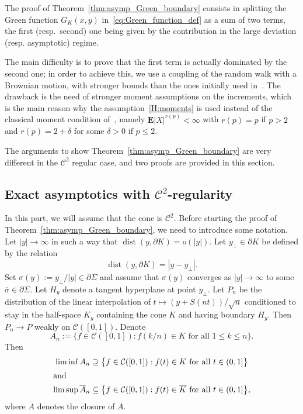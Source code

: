 \documentclass[10pt]{amsart}
\theoremstyle{definition}\newtheorem{defi}[theo]{Definition}\newtheorem{rema}[theo]{Remark}\newtheorem{exam}[theo]{Example}\newtheorem{exem}[theo]{Example}\newtheorem{nota}[theo]{Notation}
\DeclareMathOperator{\dist}{dist}
\newcommand{\clC}{\mathcal{C}}
\newcommand{\e}{\mathbf{E}}
\renewcommand{\le}{\leqslant}
\renewcommand{\leq}{\leqslant}
\begin{document}
The proof of Theorem~\ref{thm:asymp_Green_boundary} consists in splitting the Green function $G_K(x,y)$ in~\eqref{eq:Green_function_def} as a sum of two terms, the first (resp.\ second) one being given by the contribution in the large deviation (resp. asymptotic) regime.

The main difficulty is to prove that the first term is actually dominated by the second one; in order to achieve this, we use a coupling of the random walk with a Brownian motion, with stronger bounds than the ones initially used in~\cite{DeWa-15}. The drawback is the need of stronger moment assumptions on the increments, which is the main reason why the assumption~\eqref{H:moments} is used instead of the classical moment condition of~\cite{DeWa-15}, namely $\e| X|^{r(p)}<\infty$ with $r(p)=p$ if $p>2$ and $r(p)=2+\delta$ for some $\delta>0$ if $p\leq 2$.

The arguments to show Theorem~\ref{thm:asymp_Green_boundary} are very different in the $\clC^2$ regular case, and two proofs are provided in this section.

\subsection*{Exact asymptotics with \texorpdfstring{$\clC^{2}$}{C2}-regularity} In this part, we will assume that the cone is $\clC^{2}$. Before starting the proof of Theorem~\ref{thm:asymp_Green_boundary}, we need to introduce some notation. Let $| y|\to\infty$ in such a way that $\dist(y,\partial K)=o(| y|)$. Let $y_\perp\in\partial K$ be defined by the relation
\[
\dist(y,\partial K)=|y-y_\perp|.
\]
Set $\sigma(y):=y_\perp/| y|\in\partial\Sigma$ and assume that $\sigma(y)$ converges as $| y|\to\infty$ to some $\overline{\sigma}\in \partial\Sigma$. Let $H_y$ denote a tangent hyperplane at point $y_\perp.$ Let $P_n$ be the distribution of the linear interpolation of $t\mapsto (y+S(nt))/\sqrt{n}$ conditioned to stay in the half-space $K_y$ containing the cone $K$ and having boundary $H_y$. Then $P_n\to P$ weakly on $\clC([0,1])$. Denote
\[
A_n:=\big\{f\in \clC([0,1]): f(k/n)\in K\text{ for all }1\le k\le n\big\}.
\]
Then
\begin{align*}
\liminf A_n &\supseteq\big\{f\in \clC([0,1]): f(t)\in K\text{ for all }t\in(0,1]\big\}\\
\intertext{and}
\limsup \overline{A}_n &\subseteq\big\{f\in \clC([0,1]): f(t)\in \overline{K}\text{ for all }t\in(0,1]\big\},
\end{align*}
where $\overline{A}$ denotes the closure of $A$.
\end{document}
